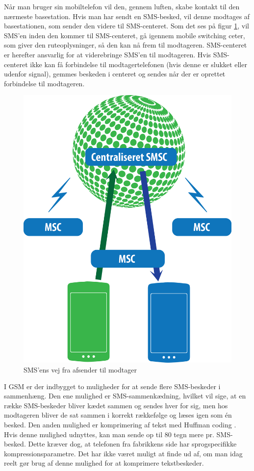 Når man bruger sin mobiltelefon vil den, gennem luften, skabe kontakt til den nærmeste basestation. Hvis man har sendt en SMS-besked, vil denne modtages af basestationen, som sender den videre til SMS-centeret. Som det ses på figur \ref{GSM}, vil SMS'en inden den kommer til SMS-centeret, gå igennem mobile switching ceter, som giver den ruteoplysninger, så den kan nå frem til modtageren. SMS-centeret er herefter ansvarlig for at viderebringe SMS’en til modtageren. Hvis SMS-centeret ikke kan få forbindelse til modtagertelefonen (hvis denne er slukket eller udenfor signal), gemmes beskeden i centeret og sendes når der er oprettet forbindelse til modtageren. \cite{info}

\begin{figure}[H]
\centering
\includegraphics [width=0.6\linewidth]{Billeder/GSMnetvaerk.png}
\caption {SMS'ens vej fra afsender til modtager \cite{info}}
\label {GSM}
\end{figure} 

I GSM er der indbygget to muligheder for at sende flere SMS-beskeder i sammenhæng. Den ene mulighed er SMS-sammenkædning, hvilket vil sige, at en række SMS-beskeder bliver kædet sammen og sendes hver for sig, men hos modtageren bliver de sat sammen i korrekt rækkefølge og læses igen som én besked. Den anden mulighed er komprimering af tekst med Huffman coding \cite{UNI}. Hvis denne mulighed udnyttes, kan man sende op til 80 tegn mere pr. SMS-besked. Dette kræver dog, at telefonen fra fabrikkens side har sprogspecifikke kompressionsparametre. Det har ikke været muligt at finde ud af, om man idag reelt gør brug af denne mulighed for at komprimere tekstbeskeder. 
